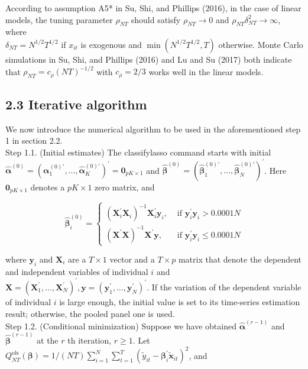 \documentclass[10pt]{article}
\begin{document}
According to assumption A5* in Su, Shi, and Phillips (2016), in the case of linear models, the tuning parameter $\rho_{N T}$ should satisfy $\rho_{N T} \rightarrow 0$ and $\rho_{N T} \delta_{N T}^{2} \rightarrow \infty$, where\\
$\delta_{N T}=N^{1 / 2} T^{1 / 2}$ if $x_{i t}$ is exogenous and $\min \left(N^{1 / 2} T^{1 / 2}, T\right)$ otherwise. Monte Carlo simulations in Su, Shi, and Phillips (2016) and Lu and Su (2017) both indicate that $\rho_{N T}=c_{\rho}(N T)^{-1 / 2}$ with $c_{\rho}=2 / 3$ works well in the linear models.

\subsection*{2.3 Iterative algorithm}
We now introduce the numerical algorithm to be used in the aforementioned step 1 in section 2.2.\\
Step 1.1. (Initial estimates) The classifylasso command starts with initial $\widehat{\boldsymbol{\alpha}}^{(0)}= \left(\boldsymbol{\alpha}_{1}^{(0) \prime}, \ldots, \widehat{\boldsymbol{\alpha}}_{K}^{(0) \prime}\right)^{\prime}=\mathbf{0}_{p K \times 1}$ and $\widehat{\boldsymbol{\beta}}^{(0)}=\left(\widehat{\boldsymbol{\beta}}_{1}^{(0) \prime}, \ldots, \widehat{\boldsymbol{\beta}}_{N}^{(0) \prime}\right)^{\prime}$. Here $\mathbf{0}_{p K \times 1}$ denotes a $p K \times 1$ zero matrix, and

$$
\widehat{\boldsymbol{\beta}}_{i}^{(0)}= \begin{cases}\left(\mathbf{X}_{i}^{\prime} \mathbf{X}_{i}\right)^{-1} \mathbf{X}_{i}^{\prime} \mathbf{y}_{i}, & \text { if } \mathbf{y}_{i}^{\prime} \mathbf{y}_{i}>0.0001 N \\ \left(\mathbf{X}^{\prime} \mathbf{X}\right)^{-1} \mathbf{X}^{\prime} \mathbf{y}, & \text { if } \mathbf{y}_{i}^{\prime} \mathbf{y}_{i} \leq 0.0001 N\end{cases}
$$

where $\mathbf{y}_{i}$ and $\mathbf{X}_{i}$ are a $T \times 1$ vector and a $T \times p$ matrix that denote the dependent and independent variables of individual $i$ and $\mathbf{X}=\left(\mathbf{X}_{1}^{\prime}, \ldots, \mathbf{X}_{N}^{\prime}\right)^{\prime}, \mathbf{y}=\left(\mathbf{y}_{1}^{\prime}, \ldots, \mathbf{y}_{N}^{\prime}\right)^{\prime}$. If the variation of the dependent variable of individual $i$ is large enough, the initial value is set to its time-series estimation result; otherwise, the pooled panel one is used.\\
Step 1.2. (Conditional minimization) Suppose we have obtained $\widehat{\boldsymbol{\alpha}}^{(r-1)}$ and $\widehat{\boldsymbol{\beta}}^{(r-1)}$ at the $r$ th iteration, $r \geq 1$. Let $Q_{N T}^{\mathrm{ols}}(\boldsymbol{\beta})=1 /(N T) \sum_{i=1}^{N} \sum_{t=1}^{T}\left(\widetilde{y}_{i t}-\boldsymbol{\beta}_{i}^{\prime} \widetilde{\mathbf{x}}_{i t}\right)^{2}$, and
\end{document}
